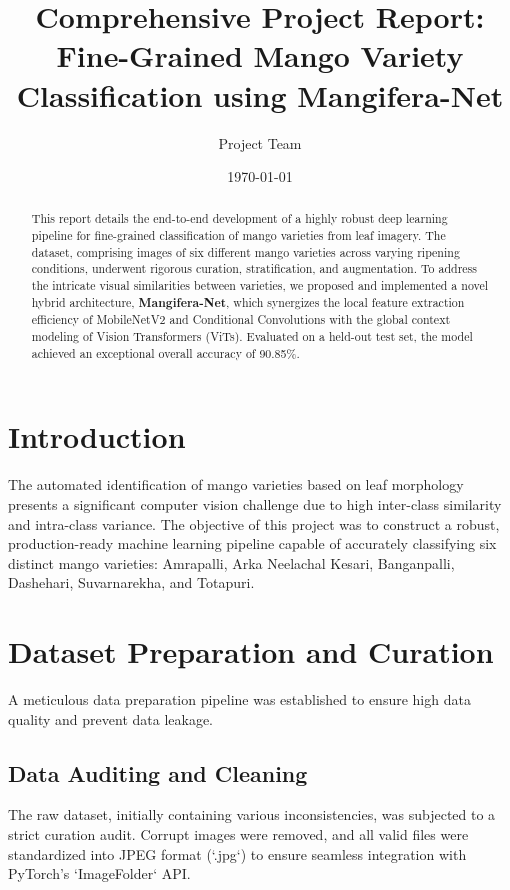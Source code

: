 \documentclass[12pt,a4paper]{article}
\title{Comprehensive Project Report: Fine-Grained Mango Variety Classification using Mangifera-Net}
\author{Project Team}
\date{\today}
\begin{document}
\maketitle

\begin{abstract}
This report details the end-to-end development of a highly robust deep learning pipeline for fine-grained classification of mango varieties from leaf imagery. The dataset, comprising images of six different mango varieties across varying ripening conditions, underwent rigorous curation, stratification, and augmentation. To address the intricate visual similarities between varieties, we proposed and implemented a novel hybrid architecture, \textbf{Mangifera-Net}, which synergizes the local feature extraction efficiency of MobileNetV2 and Conditional Convolutions with the global context modeling of Vision Transformers (ViTs). Evaluated on a held-out test set, the model achieved an exceptional overall accuracy of 90.85\%.
\end{abstract}

\section{Introduction}
The automated identification of mango varieties based on leaf morphology presents a significant computer vision challenge due to high inter-class similarity and intra-class variance. The objective of this project was to construct a robust, production-ready machine learning pipeline capable of accurately classifying six distinct mango varieties: Amrapalli, Arka Neelachal Kesari, Banganpalli, Dashehari, Suvarnarekha, and Totapuri. 

\section{Dataset Preparation and Curation}
A meticulous data preparation pipeline was established to ensure high data quality and prevent data leakage.

\subsection{Data Auditing and Cleaning}
The raw dataset, initially containing various inconsistencies, was subjected to a strict curation audit. Corrupt images were removed, and all valid files were standardized into JPEG format (`.jpg`) to ensure seamless integration with PyTorch's `ImageFolder` API. 
\end{document}
